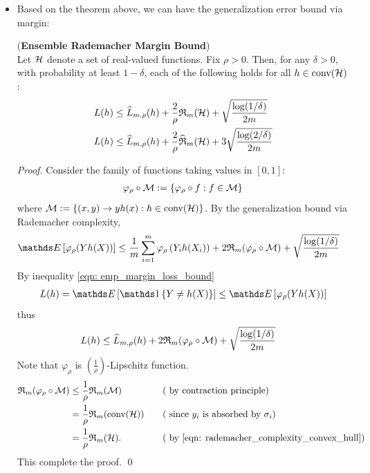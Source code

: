 \documentclass[11pt]{article}
\begin{document}
\begin{itemize}
\item Based on the theorem above, we can have the generalization error bound via margin:
\begin{theorem} (\textbf{Ensemble Rademacher Margin Bound})  \citep{schapire2012boosting, mohri2018foundations} \\
Let ${\mathcal H}$ denote a set of real-valued functions. Fix $\rho > 0$. Then, for any $\delta > 0$, with
probability at least $1 - \delta$, each of the following holds for all $h \in \text{conv}({\mathcal H})$:
\begin{align}
L(h) &\le \widehat{L}_{m, \rho}(h) + \frac{2}{\rho} {\mathfrak R}_{m}({\mathcal H})  + \sqrt{\frac{\log(1 / \delta)}{2m}} \label{ineqn: Rademacher_margin_bound}\\
L(h) &\le \widehat{L}_{m, \rho}(h)  +  \frac{2}{\rho} \widehat{\mathfrak{R}}_{m}({\mathcal H}) + 3\sqrt{\frac{\log(2 / \delta)}{2m}}  \label{ineqn: Rademacher_margin_bound_2}
\end{align}
\end{theorem}
\begin{proof}
Consider the family of functions taking values in $[0, 1]$:
\begin{align*}
\varphi_{\rho} \circ {\mathcal M} := \left\{\varphi_{\rho} \circ f:  f\in {\mathcal M}\right\}
\end{align*} where ${\mathcal M} := \left\{(x,y) \to yh(x): h \in  \text{conv}({\mathcal H})\right\}$. By the generalization bound via Rademacher complexity,
\begin{align*}
\E{}{\varphi_{\rho}(Y h(X))} &\le \frac{1}{m}\sum_{i=1}^{m}\varphi_{\rho}\paren{Y_i h(X_i)} + 2 \frR_{m}(\varphi_{\rho} \circ \cM )  + \sqrt{\frac{\log(1 / \delta)}{2m}}
\end{align*} By inequality \eqref{eqn: emp_margin_loss_bound}
\begin{align*}
L(h) =\E{}{\ind{Y \neq h(X)}} \le \E{}{\varphi_{\rho}(Y h(X))}
\end{align*} thus
\begin{align*}
L(h)  &\le \widehat{L}_{m, \rho}(h) + 2 {\mathfrak R}_{m}(\varphi_{\rho} \circ {\mathcal M} )  + \sqrt{\frac{\log(1 / \delta)}{2m}}
\end{align*}
Note that $\varphi_{\rho}$ is $(\frac{1}{\rho})$-Lipschitz function. 
\begin{align*}
{\mathfrak R}_{m}(\varphi_{\rho} \circ {\mathcal M} ) &\le  \frac{1}{\rho}{\mathfrak R}_{m}( {\mathcal M} ) &&\quad  (\text{ by contraction principle})\\
&= \frac{1}{\rho}{\mathfrak R}_{m}(\text{conv}({\mathcal H}) ) &&\quad  (\text{ since $y_i$ is absorbed by $\sigma_i$})\\
&= \frac{1}{\rho}{\mathfrak R}_{m}({\mathcal H}). &&\quad  (\text{ by \eqref{eqn: rademacher_complexity_convex_hull}})
\end{align*} This complete the proof. \qed
\end{proof}


\end{itemize}
\end{document}
